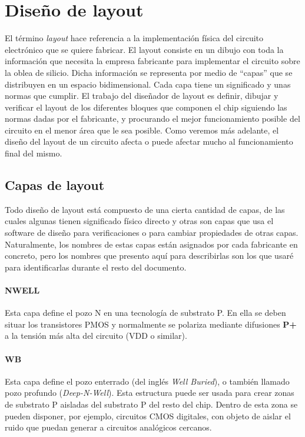 \section{Diseño de layout}\label{cap:layout}

El término \textit{layout} hace referencia a la implementación física del circuito
electrónico que se quiere fabricar. El layout consiste en un dibujo con toda
la información que necesita la empresa fabricante para implementar el circuito
sobre la oblea de silicio. Dicha información se representa por medio de ``capas''
que se distribuyen en un espacio bidimensional. Cada capa tiene un significado y
unas normas que cumplir. El trabajo del diseñador de layout es definir, dibujar y
verificar el layout de los diferentes bloques que componen el chip siguiendo
las normas dadas por el fabricante, y procurando el mejor funcionamiento posible
del circuito en el menor área que le sea posible.
Como veremos más adelante, el diseño del layout de un circuito afecta o puede afectar
mucho al funcionamiento final del mismo.\\

\subsection{Capas de layout}\label{cap:capas_layout}

Todo diseño de layout está compuesto de una cierta cantidad de capas, de las cuales
algunas tienen significado físico directo y otras son capas que usa el software de
diseño para verificaciones o para cambiar propiedades de otras capas.\\

Naturalmente, los nombres de estas capas están asignados por cada fabricante en
concreto, pero los nombres que presento aquí para describirlas son los que usaré
para identificarlas durante el resto del documento.\\

\paragraph{NWELL}
Esta capa define el pozo N en una tecnología de substrato P. En ella se deben
situar los transistores PMOS y normalmente se polariza mediante difusiones \textbf{P+}
a la tensión más alta del circuito (VDD o similar).

\paragraph{WB}
Esta capa define el pozo enterrado (del inglés \textit{Well Buried}), o también
llamado pozo profundo (\textit{Deep-N-Well}). Esta estructura
puede ser usada para crear zonas de substrato P aisladas del substrato
P del resto del chip. Dentro de esta zona se pueden disponer, por ejemplo, circuitos
CMOS digitales, con objeto de aislar el ruido que puedan generar a circuitos analógicos
cercanos.

